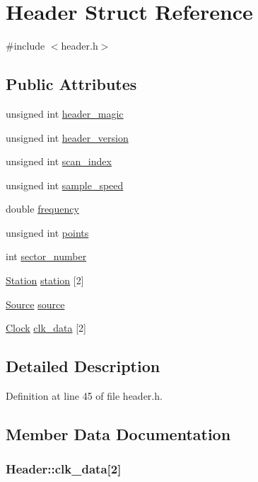 \hypertarget{structHeader}{
\section{Header Struct Reference}
\label{structHeader}
}


{\ttfamily \#include $<$header.h$>$}\subsection*{Public Attributes}
\begin{DoxyCompactItemize}
\item 
unsigned int \hyperlink{structHeader_a76d42241732e2ac2bf57bdd38dbe23f6}{header\_\-magic}
\item 
unsigned int \hyperlink{structHeader_ac390c4008157e7523e4f8f562b4ef9c2}{header\_\-version}
\item 
unsigned int \hyperlink{structHeader_a43071722fb67652bad41c74b62163daa}{scan\_\-index}
\item 
unsigned int \hyperlink{structHeader_a1162598c019db96cc5feb7e001c89445}{sample\_\-speed}
\item 
double \hyperlink{structHeader_a9d7ecc5126a657a40335da72f3a2ea8c}{frequency}
\item 
unsigned int \hyperlink{structHeader_ac8eec35b5a87d9536e73872420d4c933}{points}
\item 
int \hyperlink{structHeader_ade22c8b450e0ecfece5cca1daf8a91ea}{sector\_\-number}
\item 
\hyperlink{structStation}{Station} \hyperlink{structHeader_a93e7c152ec198fa6c419fe809cb674f6}{station} \mbox{[}2\mbox{]}
\item 
\hyperlink{structSource}{Source} \hyperlink{structHeader_aecdafddd43ad4d9cd45e2b0140d1b723}{source}
\item 
\hyperlink{structClock}{Clock} \hyperlink{structHeader_a96b8d0a69ab6a697c7b15b9f7f43dc11}{clk\_\-data} \mbox{[}2\mbox{]}
\end{DoxyCompactItemize}


\subsection{Detailed Description}


Definition at line 45 of file header.h.

\subsection{Member Data Documentation}
\hypertarget{structHeader_a96b8d0a69ab6a697c7b15b9f7f43dc11}{
\subsubsection[{clk\_\-data}]{ {\bf Header::clk\_\-data}\mbox{[}2\mbox{]}}}
\label{structHeader_a96b8d0a69ab6a697c7b15b9f7f43dc11}


